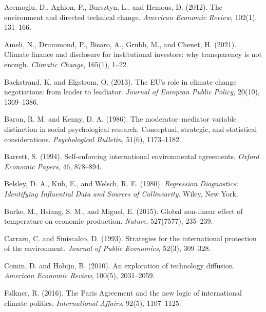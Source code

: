 \documentclass[10pt,a4paper]{article}
\begin{document}
\begin{list}{}{\setlength\leftmargin{1.5em}\setlength\itemindent{-1.5em}\setlength\itemsep{0.4em}}

\item Acemoglu, D., Aghion, P., Bursztyn, L., and Hemous, D. (2012). The environment and directed
technical change. \textit{American Economic Review}, 102(1), 131--166.

\item Ameli, N., Drummond, P., Bisaro, A., Grubb, M., and Chenet, H. (2021). Climate finance and
disclosure for institutional investors: why transparency is not enough. \textit{Climatic Change},
165(1), 1--22.

\item Backstrand, K. and Elgstrom, O. (2013). The EU's role in climate change negotiations: from leader
to leadiator. \textit{Journal of European Public Policy}, 20(10), 1369--1386.

\item Baron, R. M. and Kenny, D. A. (1986). The moderator--mediator variable distinction in social psychological research: Conceptual, strategic, and statistical considerations. \textit{Psychological Bulletin}, 51(6), 1173--1182.

\item Barrett, S. (1994). Self-enforcing international environmental agreements. \textit{Oxford Economic
Papers}, 46, 878--894.

\item Belsley, D. A., Kuh, E., and Welsch, R. E. (1980). \textit{Regression Diagnostics: Identifying
Influential Data and Sources of Collinearity}. Wiley, New York.

\item Burke, M., Hsiang, S. M., and Miguel, E. (2015). Global non-linear effect of temperature on
economic production. \textit{Nature}, 527(7577), 235--239.

\item Carraro, C. and Siniscalco, D. (1993). Strategies for the international protection of the environment.
\textit{Journal of Public Economics}, 52(3), 309--328.

\item Comin, D. and Hobijn, B. (2010). An exploration of technology diffusion. \textit{American Economic
Review}, 100(5), 2031--2059.

\item Falkner, R. (2016). The Paris Agreement and the new logic of international climate politics.
\textit{International Affairs}, 92(5), 1107--1125.


\end{list}
\end{document}
